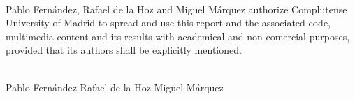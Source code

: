 \newpage %
	\paragraph{}
	Pablo Fernández, Rafael de la Hoz and Miguel Márquez authorize Complutense University 
	of Madrid to spread and use this report and the associated code, multimedia content and its results with academical and non-comercial purposes,
	provided that its authors shall be explicitly mentioned.
	\begin{center}
    	\thedate \\
	    \vspace{5.5in}
		Pablo Fernández\hspace{0.75in}
		Rafael de la Hoz\hspace{0.75in}
		Miguel Márquez
	\end{center}
